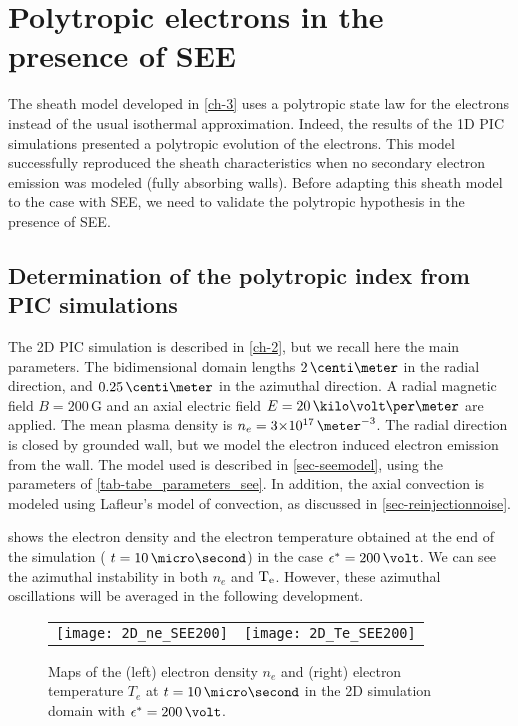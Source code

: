 

\section{Polytropic electrons in the presence of \acs{SEE}}
\label{sec-PIC_poly}

The sheath model developed in \cref{ch-3} uses a polytropic state law for the electrons instead of the usual isothermal approximation.
Indeed, the results of the  \ac{1D} \ac{PIC} simulations presented a polytropic evolution of the electrons.
This model successfully reproduced the sheath characteristics  when no secondary electron emission was modeled (fully absorbing walls).
Before adapting this sheath model to the case with \ac{SEE}, we need to validate the polytropic hypothesis in the presence of \ac{SEE}.


\subsection{Determination of the polytropic index from PIC simulations} \label{subsec-fluid_see_polyfit}


The \ac{2D} \ac{PIC} simulation is described in \cref{ch-2}, but we recall here the main parameters.
The bidimensional domain lengths $2\,\centi\meter$ in the radial direction, and $0.25\,\centi\meter$ in the azimuthal direction.
A radial magnetic field $B=200\,$G and an axial electric field $E=20\,\kilo\volt\per\meter$ are applied.
The mean plasma density is $n_e = \sn{3}{17}\,\meter^{-3}$.
The radial direction is closed by grounded wall, but we model the electron induced electron emission from the wall.
The model used is described in \cref{sec-seemodel}, using the parameters of \cref{tab-tabe_parameters_see}.
In addition, the axial convection is modeled using Lafleur's model of convection, as discussed in \cref{sec-reinjectionnoise}.

 shows the electron density and the electron temperature obtained at the end of the simulation ( $t=10\,\micro\second$) in the case $\crover=200\,\volt$.
We can see the azimuthal instability in both $n_e$ and $\mathrm{T_e}$.
However, these azimuthal oscillations will be averaged in the following development. 


\begin{figure}[!htb]
  \centering
  \begin{tabular}{@{} c c}
    \texttt{[image: 2D\_ne\_SEE200]} &
    \texttt{[image: 2D\_Te\_SEE200]} \\
  \end{tabular}
  \caption{Maps of the (left) electron density $n_e$ and (right) electron temperature $T_e$ at $t=10\,\micro\second$ in the \acs{2D} simulation domain with $\crover=200\,\volt$.}
  \label{fig-2DneTe}
\end{figure}



